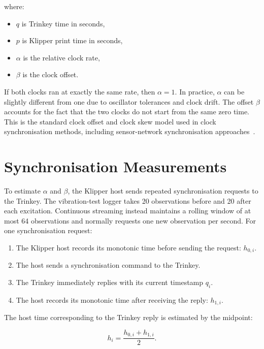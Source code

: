 \documentclass[11pt,a4paper]{article}
\begin{document}
where:

\begin{itemize}
    \item \(q\) is Trinkey time in seconds,
    \item \(p\) is Klipper print time in seconds,
    \item \(\alpha\) is the relative clock rate,
    \item \(\beta\) is the clock offset.
\end{itemize}

If both clocks ran at exactly the same rate, then \(\alpha = 1\). In practice,
\(\alpha\) can be slightly different from one due to oscillator tolerances and
clock drift. The offset \(\beta\) accounts for the fact that the two clocks do
not start from the same zero time. This is the standard clock offset and clock
skew model used in clock synchronisation methods, including sensor-network
synchronisation approaches~\cite{elson2002rbs}.

\section{Synchronisation Measurements}

To estimate \(\alpha\) and \(\beta\), the Klipper host sends repeated
synchronisation requests to the Trinkey. The vibration-test logger takes 20
observations before and 20 after each excitation. Continuous streaming instead
maintains a rolling window of at most 64 observations and normally requests one
new observation per second. For one synchronisation request:

\begin{enumerate}
    \item The Klipper host records its monotonic time before sending the request:
    \(h_{0,i}\).
    \item The host sends a synchronisation command to the Trinkey.
    \item The Trinkey immediately replies with its current timestamp
    \(q_i\).
    \item The host records its monotonic time after receiving the reply:
    \(h_{1,i}\).
\end{enumerate}

The host time corresponding to the Trinkey reply is estimated by the midpoint:

\begin{equation}
    h_i = \frac{h_{0,i} + h_{1,i}}{2}.
    \label{eq:midpoint}
\end{equation}
\end{document}
